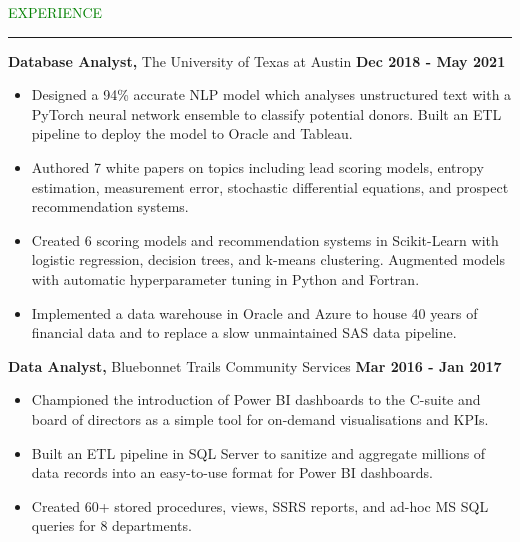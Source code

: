 \documentclass [
        11pt
] {article}
\begin{document}

\noindent\textcolor{green}{EXPERIENCE \rule{15.8cm}{1pt}}

\vspace*{10pt}

\noindent \textbf {Database Analyst,} The University of Texas at Austin
\hspace*{\fill} \textbf {Dec 2018 - May 2021}


\begin{itemize}[itemsep=1pt,topsep=1pt]
\renewcommand{\labelitemi}{\scriptsize$\blacksquare$}

\item Designed a 94\% accurate NLP model which analyses unstructured text with
a PyTorch neural network ensemble to classify potential donors.
Built an ETL pipeline to deploy the model to Oracle and Tableau.

\item Authored 7 white papers on topics including lead scoring models, entropy
estimation, measurement error, stochastic differential equations, and prospect
recommendation systems.

\item Created 6 scoring models and recommendation systems in Scikit-Learn with
logistic regression, decision trees, and k-means clustering. Augmented models
with automatic hyperparameter tuning in Python and Fortran.

\item Implemented a data warehouse in Oracle and Azure to house 40 years of
financial data and to replace a slow unmaintained SAS data pipeline.

\end{itemize}

\vspace*{5pt}

\noindent \textbf {Data Analyst,} Bluebonnet Trails Community Services
\hspace*{\fill} \textbf {Mar 2016 - Jan 2017}


\begin{itemize}[itemsep=1pt,topsep=1pt]
\renewcommand{\labelitemi}{\scriptsize$\blacksquare$}


\item Championed the introduction of Power BI dashboards to the C-suite
and board of directors as a simple tool for on-demand visualisations and KPIs.

\item Built an ETL pipeline in SQL Server to sanitize and aggregate
millions of data records into an easy-to-use format for Power BI dashboards.

\item Created 60+ stored procedures, views, SSRS reports, and ad-hoc
MS SQL queries for 8 departments.

\end{itemize}
\end{document}
